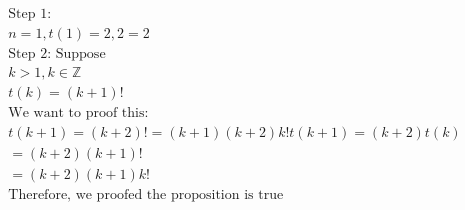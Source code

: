 \documentclass[12pt]{article}
\begin{document}
\begin{itemize}
\begin{equation*}
\begin{split}
		    \text{Step 1:}\\
		    n = 1, t(1) = 2, 2=2\\
		    \text{Step 2: Suppose}\\
		    k > 1, k \in \mathbb{Z}\\
		    t(k) = (k+1)!\\
		    \text{We want to proof this:}\\
		    t(k+1) = (k+2)! = (k+1)(k+2)k!
		    t(k+1) = (k+2)t(k)\\
		    = (k+2)(k+1)!\\
		    = (k+2)(k+1)k!\\
		    \text{Therefore, we proofed the proposition is true}
		\end{split}
	\end{equation*}
\end{itemize}
\end{document}
